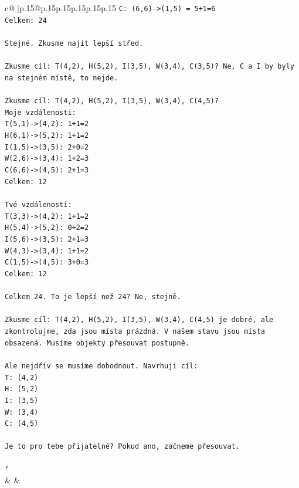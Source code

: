 \documentclass{article}
\begin{document}
{\begin{supertabular}{c@{$\;$}|p{.15\linewidth}@{}p{.15\linewidth}p{.15\linewidth}p{.15\linewidth}p{.15\linewidth}p{.15\linewidth}}
{{{\texttt{C: (6,6){-}>(1,5) = 5+1=6} \\
\texttt{Celkem: 24} \\
\\ 
\texttt{Stejné. Zkusme najít lepší střed.} \\
\\ 
\texttt{Zkusme cíl: T(4,2), H(5,2), I(3,5), W(3,4), C(3,5)? Ne, C a I by byly na stejném místě, to nejde.} \\
\\ 
\texttt{Zkusme cíl: T(4,2), H(5,2), I(3,5), W(3,4), C(4,5)?} \\
\texttt{Moje vzdálenosti:} \\
\texttt{T(5,1){-}>(4,2): 1+1=2} \\
\texttt{H(6,1){-}>(5,2): 1+1=2} \\
\texttt{I(1,5){-}>(3,5): 2+0=2} \\
\texttt{W(2,6){-}>(3,4): 1+2=3} \\
\texttt{C(6,6){-}>(4,5): 2+1=3} \\
\texttt{Celkem: 12} \\
\\ 
\texttt{Tvé vzdálenosti:} \\
\texttt{T(3,3){-}>(4,2): 1+1=2} \\
\texttt{H(5,4){-}>(5,2): 0+2=2} \\
\texttt{I(5,6){-}>(3,5): 2+1=3} \\
\texttt{W(4,3){-}>(3,4): 1+1=2} \\
\texttt{C(1,5){-}>(4,5): 3+0=3} \\
\texttt{Celkem: 12} \\
\\ 
\texttt{Celkem 24. To je lepší než 24? Ne, stejně.} \\
\\ 
\texttt{Zkusme cíl: T(4,2), H(5,2), I(3,5), W(3,4), C(4,5) je dobré, ale zkontrolujme, zda jsou místa prázdná. V našem stavu jsou místa obsazená. Musíme objekty přesouvat postupně.} \\
\\ 
\texttt{Ale nejdřív se musíme dohodnout. Navrhuji cíl:} \\
\texttt{T: (4,2)} \\
\texttt{H: (5,2)} \\
\texttt{I: (3,5)} \\
\texttt{W: (3,4)} \\
\texttt{C: (4,5)} \\
\\ 
\texttt{Je to pro tebe přijatelné? Pokud ano, začneme přesouvat.} \\
\\ 
\texttt{'} \\
            }
        }
    }
    & & \\ \\


\end{supertabular}}
\end{document}
